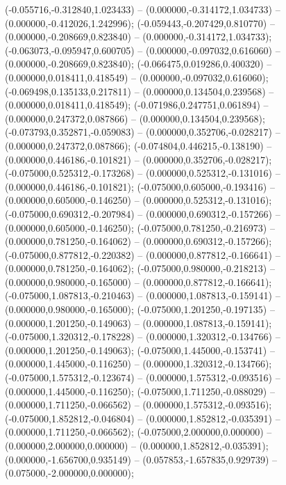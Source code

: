  (-0.055716,-0.312840,1.023433) -- (0.000000,-0.314172,1.034733) -- (0.000000,-0.412026,1.242996);
 (-0.059443,-0.207429,0.810770) -- (0.000000,-0.208669,0.823840) -- (0.000000,-0.314172,1.034733);
 (-0.063073,-0.095947,0.600705) -- (0.000000,-0.097032,0.616060) -- (0.000000,-0.208669,0.823840);
 (-0.066475,0.019286,0.400320) -- (0.000000,0.018411,0.418549) -- (0.000000,-0.097032,0.616060);
 (-0.069498,0.135133,0.217811) -- (0.000000,0.134504,0.239568) -- (0.000000,0.018411,0.418549);
 (-0.071986,0.247751,0.061894) -- (0.000000,0.247372,0.087866) -- (0.000000,0.134504,0.239568);
 (-0.073793,0.352871,-0.059083) -- (0.000000,0.352706,-0.028217) -- (0.000000,0.247372,0.087866);
 (-0.074804,0.446215,-0.138190) -- (0.000000,0.446186,-0.101821) -- (0.000000,0.352706,-0.028217);
 (-0.075000,0.525312,-0.173268) -- (0.000000,0.525312,-0.131016) -- (0.000000,0.446186,-0.101821);
 (-0.075000,0.605000,-0.193416) -- (0.000000,0.605000,-0.146250) -- (0.000000,0.525312,-0.131016);
 (-0.075000,0.690312,-0.207984) -- (0.000000,0.690312,-0.157266) -- (0.000000,0.605000,-0.146250);
 (-0.075000,0.781250,-0.216973) -- (0.000000,0.781250,-0.164062) -- (0.000000,0.690312,-0.157266);
 (-0.075000,0.877812,-0.220382) -- (0.000000,0.877812,-0.166641) -- (0.000000,0.781250,-0.164062);
 (-0.075000,0.980000,-0.218213) -- (0.000000,0.980000,-0.165000) -- (0.000000,0.877812,-0.166641);
 (-0.075000,1.087813,-0.210463) -- (0.000000,1.087813,-0.159141) -- (0.000000,0.980000,-0.165000);
 (-0.075000,1.201250,-0.197135) -- (0.000000,1.201250,-0.149063) -- (0.000000,1.087813,-0.159141);
 (-0.075000,1.320312,-0.178228) -- (0.000000,1.320312,-0.134766) -- (0.000000,1.201250,-0.149063);
 (-0.075000,1.445000,-0.153741) -- (0.000000,1.445000,-0.116250) -- (0.000000,1.320312,-0.134766);
 (-0.075000,1.575312,-0.123674) -- (0.000000,1.575312,-0.093516) -- (0.000000,1.445000,-0.116250);
 (-0.075000,1.711250,-0.088029) -- (0.000000,1.711250,-0.066562) -- (0.000000,1.575312,-0.093516);
 (-0.075000,1.852812,-0.046804) -- (0.000000,1.852812,-0.035391) -- (0.000000,1.711250,-0.066562);
 (-0.075000,2.000000,0.000000) -- (0.000000,2.000000,0.000000) -- (0.000000,1.852812,-0.035391);
 (0.000000,-1.656700,0.935149) -- (0.057853,-1.657835,0.929739) -- (0.075000,-2.000000,0.000000);
